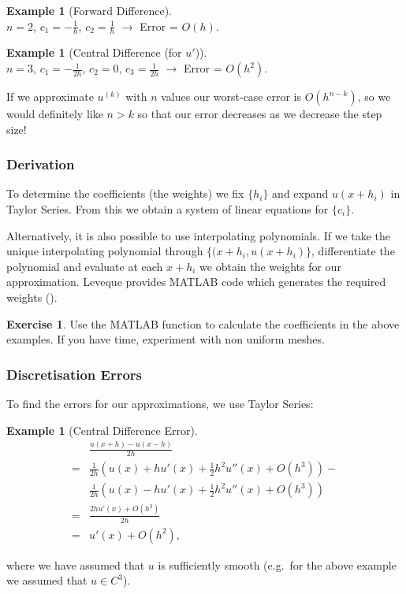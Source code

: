 \documentclass[12pt, a4paper]{article}
\theoremstyle{definition}
\newtheorem{example}[thm]{Example}
\newtheorem{exercise}[thm]{Exercise}
\theoremstyle{remark}
\numberwithin{equation}{section}
\begin{document}
\begin{example}[Forward Difference]\ \\ 
$n=2$, $c_1=-\frac{1}{h}$, $c_2=\frac{1}{h}$ $\rightarrow$ Error = $O(h)$.
\end{example}

\begin{example}[Central Difference (for $u'$)]\ \\
$n=3$, $c_1=-\frac{1}{2h}$, $c_2=0$, $c_3=\frac{1}{2h}$ $\rightarrow$ Error = $O(h^2)$.
\end{example}

If we approximate $u^{(k)}$ with $n$ values our worst-case error is $O(h^{n-k})$, so we would definitely like $n>k$ so that our error
decreases as we decrease the step size!

\subsubsection*{Derivation}

To determine the coefficients (the weights) we fix $\{h_i\}$ and expand $u(x+h_i)$ in Taylor Series. From this we obtain a
system of linear equations for $\{c_i\}$.

Alternatively, it is also possible to use interpolating polynomials. 
If we take the unique interpolating polynomial through $\{(x+h_i,u(x+h_i)\}$, 
differentiate the polynomial and evaluate at each $x+h_i$ we obtain the weights for our approximation.
Leveque provides MATLAB code which generates the required weights ().

\begin{exercise}
Use the MATLAB function  to calculate the coefficients in the above examples. If you have time, experiment with non uniform meshes. 
\end{exercise}

\newpage
\subsubsection{Discretisation Errors}

To find the errors for our approximations, we use Taylor Series:
\begin{example}[Central Difference Error]
\begin{align*}
&\frac{u(x+h)-u(x-h)}{2h}\\
=&\frac{1}{2h}\left(u(x)+hu'(x)+\frac{1}{2}h^2 u''(x)+O(h^3)\right)-\\
&\frac{1}{2h}\left(u(x)-hu'(x)+\frac{1}{2}h^2 u''(x)+O(h^3)\right)\\
=&\frac{2hu'(x)+O(h^3)}{2h}\\
=&u'(x)+O(h^2),
\end{align*}
\end{example}
where we have assumed that $u$ is sufficiently smooth (e.g.\ for the above example we assumed that $u \in C^3$).
\end{document}
